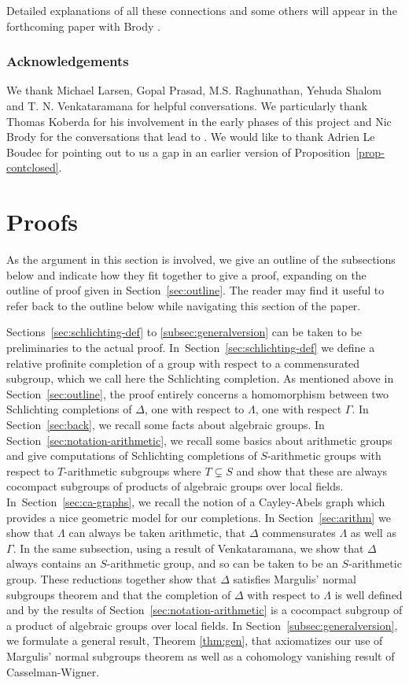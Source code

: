 \documentclass[JEP,XML,SOM,Unicode,published]{cedram}
\theoremstyle{definition}
\begin{document}
Detailed explanations of all these connections and some others will appear in the forthcoming paper with Brody \cite{BFMVL}.

\subsubsection*{Acknowledgements} We thank Michael Larsen, Gopal Prasad, M.S. Raghunathan, Yehuda Shalom and T. N. Venkataramana for helpful conversations. We particularly thank Thomas Koberda for his involvement in the early phases of this project and Nic Brody for the conversations that lead to \cite{BFMVL}. We would like to thank Adrien Le Boudec for pointing out to us a gap in
an earlier version of Proposition~\ref{prop-contclosed}.

\section{Proofs}\label{sec:proof}

As the argument in this section is involved, we give an outline of the subsections
below and indicate how they fit together to give a proof, expanding on the outline of proof given in Section~\ref{sec:outline}. The reader may find it useful to refer back to the outline below while
navigating this section of the paper.

Sections~\ref{sec:schlichting-def} to \ref{subsec:generalversion} can be taken to be preliminaries
to the actual proof. In~Section~\ref{sec:schlichting-def} we define a relative profinite completion of a group with respect to a commensurated subgroup, which we call here the Schlichting completion. As mentioned above in Section~\ref{sec:outline}, the proof entirely concerns
a homomorphism between two Schlichting completions of $\Delta$, one with respect to $\Lambda$,
one with respect $\Gamma$. In Section~\ref{sec:back}, we recall some
facts about algebraic groups. In Section~\ref{sec:notation-arithmetic}, we recall some basics about arithmetic groups and give computations of Schlichting completions of $S$-arithmetic groups with respect to $T$-arithmetic subgroups where $T \varsubsetneq S$ and show that these are always cocompact subgroups of
products of algebraic groups over local fields. In~Section~\ref{sec:ca-graphs}, we recall the notion of a Cayley-Abels graph which provides a nice geometric model for our completions. In Section~\ref{sec:arithm} we show that $\Lambda$ can always be taken arithmetic, that $\Delta$ commensurates $\Lambda$ as well as $\Gamma$. In the same subsection, using a result of Venkataramana, we show that $\Delta$ always contains an $S$-arithmetic group, and so can be taken to be an $S$-arithmetic group. These reductions together show that $\Delta$ satisfies Margulis' normal subgroups theorem and that the completion of $\Delta$ with respect
to $\Lambda$ is well defined and by the results of Section~\ref{sec:notation-arithmetic} is a
cocompact subgroup of a product of algebraic groups over local fields. In Section~\ref{subsec:generalversion}, we formulate a general result, Theorem \ref{thm:gen}, that axiomatizes our use of Margulis' normal subgroups theorem as well as a cohomology vanishing result of Casselman-Wigner.
\end{document}
